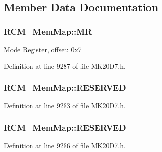 \subsection{Member Data Documentation}
\subsubsection[{\texorpdfstring{MR}{MR}}]{ R\+C\+M\+\_\+\+Mem\+Map\+::\+MR}\hypertarget{struct_r_c_m___mem_map_a0e7b707ffc94ef2a3c49a5ca51acc6c9}{}\label{struct_r_c_m___mem_map_a0e7b707ffc94ef2a3c49a5ca51acc6c9}
Mode Register, offset\+: 0x7 

Definition at line 9287 of file M\+K20\+D7.\+h.

\subsubsection[{\texorpdfstring{R\+E\+S\+E\+R\+V\+E\+D\+\_\+0}{RESERVED_0}}]{ R\+C\+M\+\_\+\+Mem\+Map\+::\+R\+E\+S\+E\+R\+V\+E\+D\+\_}\hypertarget{struct_r_c_m___mem_map_a49b7ea98d314c63638551ad99a064795}{}\label{struct_r_c_m___mem_map_a49b7ea98d314c63638551ad99a064795}


Definition at line 9283 of file M\+K20\+D7.\+h.

\subsubsection[{\texorpdfstring{R\+E\+S\+E\+R\+V\+E\+D\+\_\+1}{RESERVED_1}}]{ R\+C\+M\+\_\+\+Mem\+Map\+::\+R\+E\+S\+E\+R\+V\+E\+D\+\_}\hypertarget{struct_r_c_m___mem_map_a75dc1933a3575850aa055bb71f094323}{}\label{struct_r_c_m___mem_map_a75dc1933a3575850aa055bb71f094323}


Definition at line 9286 of file M\+K20\+D7.\+h.

